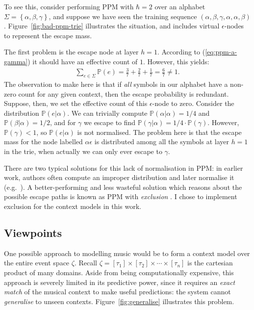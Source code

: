 \documentclass[12pt,a4paper,twoside,openright]{report}
\newcommand{\set}[1]{ \left\{ #1 \right\} }
\begin{document}
To see this, consider performing PPM with $\hbar = 2$ over an alphabet $\Sigma =
\set{\alpha,\beta,\gamma}$, and suppose we have seen the training sequence
$(\alpha,\beta,\gamma,\alpha,\alpha,\beta)$.  Figure~\ref{fig:bad-ppm-trie}
illustrates the situation, and includes virtual $\epsilon$-nodes to represent
the escape mass.

The first problem is the escape node at layer $h = 1$. According to
(\ref{eq:ppm-a-gamma}) it should have an effective count of $1$. However, this
yields:
\begin{align}
  \sum_{e \in \Sigma} \mathbb{P}(e) = \frac{3}{7} + \frac{2}{7} + \frac{1}{7} =
\frac{6}{7} \neq 1. 
\end{align} 
The observation to make here is that if \emph{all} symbols in our alphabet have
a non-zero count for any given context, then the escape probability is
redundant. Suppose, then, we set the effective count of this $\epsilon$-node to
zero. Consider the distribution $\mathbb{P}(e|\alpha)$. We can trivially compute
$\mathbb{P}(\alpha|\alpha) = 1/4$ and $\mathbb{P}(\beta|\alpha) = 1/2$, and for
$\gamma$ we escape to find $\mathbb{P}(\gamma|\alpha) = 1/4 \cdot
\mathbb{P}(\gamma)$. However, $\mathbb{P}(\gamma) < 1$, so
$\mathbb{P}(e|\alpha)$ is not normalised. The problem here is that the escape
mass for the node labelled $\alpha\epsilon$ is distributed among all the symbols
at layer $h = 1$ in the trie, when actually we can only ever escape to $\gamma$.

There are two typical solutions for this lack of normalisation in PPM: in
earlier work, authors often compute an improper distribution and later normalise
it (e.g.\ \cite{conklin1990prediction}). A better-performing and less wasteful
solution which reasons about the possible escape paths is known as PPM with
\emph{exclusion} \cite{pearce2004improved}. I chose to implement exclusion for
the context models in this work.

\subsection{Viewpoints}\label{sec:mvs-formalism}

One possible approach to modelling music would be to form a context model over
the entire event space $\zeta$.  Recall $\zeta = [\tau_1] \times [\tau_2] \times
\cdots \times [\tau_n]$ is the cartesian product of many domains. Aside from
being computationally expensive, this approach is severely limited in its
predictive power, since it requires an \emph{exact match} of the musical context
to make useful predictions: the system cannot \emph{generalise} to unseen
contexts.  Figure~\ref{fig:generalise} illustrates this problem.
\end{document}

